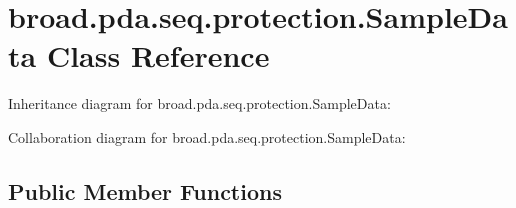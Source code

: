 \hypertarget{classbroad_1_1pda_1_1seq_1_1protection_1_1_sample_data}{\section{broad.\+pda.\+seq.\+protection.\+Sample\+Data Class Reference}
\label{classbroad_1_1pda_1_1seq_1_1protection_1_1_sample_data}
}


Inheritance diagram for broad.\+pda.\+seq.\+protection.\+Sample\+Data\+:


Collaboration diagram for broad.\+pda.\+seq.\+protection.\+Sample\+Data\+:
\subsection*{Public Member Functions}
